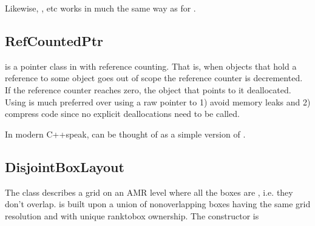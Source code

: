 \documentclass[letterpaper,10pt,english]{sphinxmanual}
\begin{document}
\begin{sphinxVerbatim}[commandchars=\\\{\},formatcom=\scriptsize]
  

   \PYG{p}{[}\PYG{p}{]}
\end{sphinxVerbatim}

\sphinxAtStartPar
Likewise, ,  etc works in much the same way as for .


\subsection{RefCountedPtr}
\label{\detokenize{Source/ChomboBasics:refcountedptr}}
\sphinxAtStartPar
{} is a pointer class in  with reference counting.
That is, when objects that hold a reference to some  object goes out of scope the reference counter is decremented.
If the reference counter reaches zero, the object that  points to it deallocated.
Using  is much preferred over using a raw pointer  to 1) avoid memory leaks and 2) compress code since no explicit deallocations need to be called.

\sphinxAtStartPar
In modern C++\sphinxhyphen{}speak,  can be thought of as a  simple version of .


\subsection{DisjointBoxLayout}
\label{\detokenize{Source/ChomboBasics:disjointboxlayout}}
\sphinxAtStartPar
The  class describes a grid on an AMR level where all the boxes are , i.e. they don’t overlap.
 is built upon a union of non\sphinxhyphen{}overlapping boxes having the same grid resolution and with unique rank\sphinxhyphen{}to\sphinxhyphen{}box ownership.
The constructor is
\end{document}
